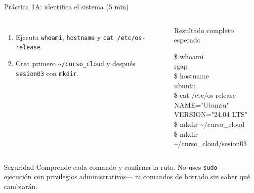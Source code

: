 \documentclass[aspectratio=169,10pt,c]{beamer}
\begin{document}
\begin{frame}{Práctica 1A: identifica el sistema \textnormal{\small(5 min)}}
\begin{columns}[T,onlytextwidth]
\begin{enumerate}\setlength\itemsep{4pt}\small
  \item Ejecuta \texttt{whoami}, \texttt{hostname} y \texttt{cat /etc/os-release}.
  \item Crea primero \texttt{\textasciitilde/curso\_cloud} y después \texttt{sesion03} con \texttt{mkdir}.
\end{enumerate}
\begin{exampleblock}{Resultado completo esperado}
\begin{terminal}
\$ whoami\\
rgap\\
\$ hostname\\
ubuntu\\
\$ cat /etc/os-release\\
NAME="Ubuntu"\\
VERSION="24.04 LTS"\\
\$ mkdir \textasciitilde/curso\_cloud\\
\$ mkdir \textasciitilde/curso\_cloud/sesion03
\end{terminal}
\end{exampleblock}
\end{columns}
\begin{alertblock}{Seguridad}
\small Comprende cada comando y confirma la ruta. No uses \texttt{sudo} —ejecución con privilegios administrativos— ni comandos de borrado sin saber qué cambiarán.
\end{alertblock}
\end{frame}
\end{document}
